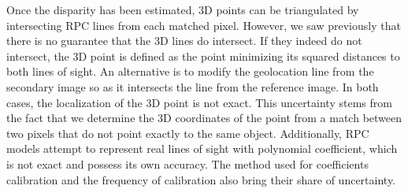 Once the disparity has been estimated, 3D points can be triangulated by intersecting RPC lines from each matched pixel. However, we saw previously that there is no guarantee that the 3D lines do intersect. If they indeed do not intersect, the 3D point is defined as the point minimizing its squared distances to both lines of sight. An alternative is to modify the geolocation line from the secondary image so as it intersects the line from the reference image. In both cases, the localization of the 3D point is not exact. This uncertainty stems from the fact that we determine the 3D coordinates of the point from a match between two pixels that do not point exactly to the same object. Additionally, RPC models attempt to represent real lines of sight with polynomial coefficient, which is not exact and possess its own accuracy. The method used for coefficients calibration and the frequency of calibration also bring their share of uncertainty.

